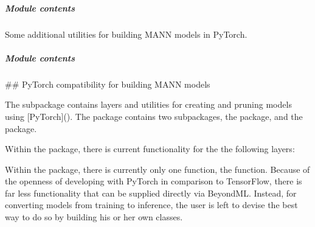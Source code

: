 \documentclass[letterpaper,10pt,english]{sphinxmanual}
\begin{document}
\subparagraph{Module contents}
\label{\detokenize{beyondml.pt.utils:module-beyondml.pt.utils}}\label{\detokenize{beyondml.pt.utils:module-contents}}
\sphinxAtStartPar
Some additional utilities for building MANN models in PyTorch.


\subparagraph{Module contents}
\label{\detokenize{beyondml.pt:module-beyondml.pt}}\label{\detokenize{beyondml.pt:module-contents}}
\sphinxAtStartPar
\#\# PyTorch compatibility for building MANN models

\sphinxAtStartPar
The  subpackage contains layers and utilities for creating and pruning models using {[}PyTorch{]}().
The package contains two subpackages, the  package, and the  package.

\sphinxAtStartPar
Within the  package, there is current functionality for the the following layers:
\sphinxhyphen{} 
\sphinxhyphen{} 
\sphinxhyphen{} 
\sphinxhyphen{} 
\sphinxhyphen{} 
\sphinxhyphen{} 
\sphinxhyphen{} 
\sphinxhyphen{} 
\sphinxhyphen{} 
\sphinxhyphen{} 
\sphinxhyphen{} 
\sphinxhyphen{} 
\sphinxhyphen{} 
\sphinxhyphen{} 

\sphinxAtStartPar
Within the  package, there is currently only one function, the  function. Because of
the openness of developing with PyTorch in comparison to TensorFlow, there is far less functionality that
can be supplied directly via BeyondML. Instead, for converting models from training to inference, the user
is left to devise the best way to do so by building his or her own classes.
\end{document}
